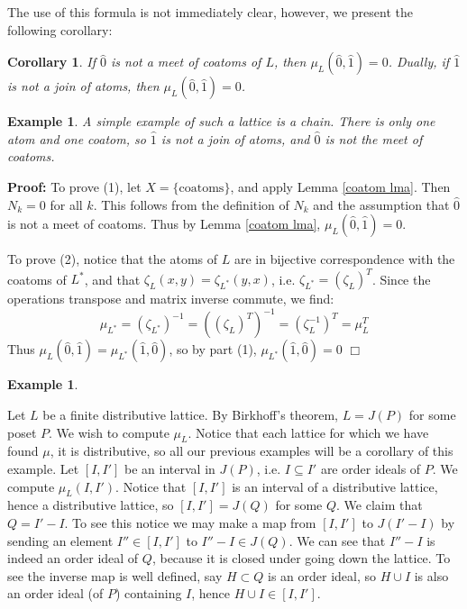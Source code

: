 \documentclass[11pt]{article}
\newtheorem{corollary}[theorem]{Corollary}
\newtheorem{example}[theorem]{Example}
\newenvironment{proof}{\noindent \textbf{Proof:}}{$\Box$}
\begin{document}
The use of this formula is not immediately clear, however, we present the following corollary:

\begin{corollary}
If $\hat{0}$ is not a meet of coatoms of $L$, then $\mu_L(\hat{0},\hat{1})=0$. Dually, if $\hat{1}$ is not a join of atoms, then $\mu_L(\hat{0},\hat{1})=0$.
\end{corollary}

\begin{example}
A simple example of such a lattice is a chain. There is only one atom and one coatom, so $\hat{1}$ is not a join of atoms, and $\hat{0}$ is not the meet of coatoms.
\end{example}

\begin{proof}
To prove (1), let $X=\{\mbox{coatoms}\}$, and apply Lemma \ref{coatom lma}. Then $N_k=0$ for all $k$. This follows from the definition of $N_k$ and the assumption that $\hat{0}$ is not a meet of coatoms. Thus by Lemma \ref{coatom lma}, $\mu_L(\hat{0},\hat{1})=0$.

To prove (2), notice that the atoms of $L$ are in bijective correspondence with the coatoms of $L^*$, and that $\zeta_L(x,y)=\zeta_{L^*}(y,x)$, i.e. $\zeta_{L^*}=(\zeta_L)^T$. Since the operations transpose and matrix inverse commute, we find:
$$\mu_{L^*}=(\zeta_{L^*})^{-1}=((\zeta_L)^T)^{-1}=(\zeta_L^{-1})^T=\mu_L^T$$
Thus $\mu_L(\hat{0},\hat{1})=\mu_{L^*}(\hat{1},\hat{0})$, so by part (1), $\mu_{L^*}(\hat{1},\hat{0})=0$
\end{proof}

\begin{example}
\end{example}
Let $L$ be a finite distributive lattice.  By Birkhoff's theorem, $L=J(P)$ for some poset $P$. We wish to compute $\mu_L$.  Notice that each lattice for which we have found $\mu$, it is distributive, so all our previous examples will be a corollary of this example.  Let $[I,I']$ be an interval in $J(P)$, i.e. $I\subseteq I'$ are order ideals of $P$. We compute $\mu_L(I,I')$. Notice that $[I,I']$ is an interval of a distributive lattice, hence a distributive lattice, so $[I,I']=J(Q)$ for some $Q$. We claim that $Q=I'-I$. To see this notice we may make a map from $[I,I']$ to $J(I'-I)$ by sending an element $I''\in [I,I']$ to $I''-I\in J(Q)$. We can see that $I''-I$ is indeed an order ideal of $Q$, because it is closed under going down the lattice. To see the inverse map is well defined, say $H\subset Q$ is an order ideal, so $H\cup I$ is also an order ideal (of $P$) containing $I$, hence $H\cup I\in [I,I']$.
\end{document}
